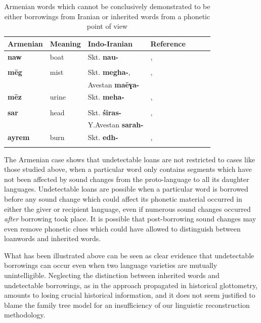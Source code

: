 \documentclass[svgnames,12pt]{scrartcl}
\newcommand{\ipa}[1]{\textbf{{\phon\mbox{#1}}}}
\begin{document}
{{\begin{table}[h]
\caption{Armenian words which cannot be conclusively demonstrated to be either borrowings from Iranian or inherited words from a phonetic point of view    } \centering \label{tab:armenian}
\begin{tabular}{lllllll}
\toprule 
Armenian & Meaning & Indo-Iranian & Reference \\
\midrule 
\ipa{naw}& boat & Skt. \ipa{nau-} & \citet[16-17;201]{huebschmann97armenische},\\
&&& \citet[466;715]{martirosyan10etymological} \\
\midrule 
\ipa{mēg}& mist & Skt. \ipa{megha-},  & \citet[474]{huebschmann97armenische},\\
&&Avestan \ipa{maēɣa-}& \citet[466;715]{martirosyan10etymological} \\
\midrule 
\ipa{mēz}& urine & Skt. \ipa{meha-} & \citet[474]{huebschmann97armenische},\\
&&& \citet[466;715]{martirosyan10etymological} \\
\midrule 
\ipa{sar}& head & Skt. \ipa{śiras-} & \citet[236;489]{huebschmann97armenische},\\
&&Y.Avestan \ipa{sarah-}& \citet[571]{martirosyan10etymological} \\
\midrule 
\ipa{ayrem}& burn & Skt. \ipa{edh-} & \citet[418]{huebschmann97armenische},\\
&&& \citet[145]{martzloff16geri} \\
\bottomrule
\end{tabular}
\end{table}
 
The Armenian case shows that undetectable loans are not restricted to cases like those studied above, when a particular word only contains segments which have not been affected by sound changes from the proto-language to all its daughter languages. Undetectable loans are possible when a particular word is borrowed before any sound change which could affect its phonetic material occurred in either the giver or recipient language, even if numerous sound changes occurred \textit{after} borrowing took place. It is possible that post-borrowing sound changes may even remove phonetic clues which could have allowed to distinguish between loanwords and inherited words.

What has been illustrated above can be seen as clear evidence that undetectable borrowings can occur
even when two language varieties are mutually unintelligible. Neglecting the distinction between
inherited words and undetectable borrowings, as in the approach propagated in historical glottometry, amounts to losing crucial
historical information, and it does not seem justified to blame the family tree model for an insufficiency
of our linguistic reconstruction methodology.

}}
\end{document}
